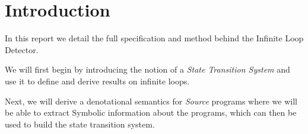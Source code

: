 

\newtheorem{example}{Example}[section]

\newtheorem{exercise}{Exercise}[section]

\newtheorem{excursion}{Excursion}[section]

\newtheorem{definition}{Definition}[section]

\newtheorem{theorem}{Theorem}[section]

\newtheorem{lemma}{Lemma}[section]

\newtheorem{corollary}{Corollary}[section]

\newtheorem{proposition}{Proposition}[section]

\newenvironment{proof}{%
\noindent
\textbf{Proof:}
}%
{
\hfill \qed\\
\medskip
}

\newcommand{\qed}{$\Box$}

\newcommand{\Rule}[2]{\genfrac{}{}{0.7pt}{}{{\setlength{\fboxrule}{0pt}\setlength{\fboxsep}{3mm}\fbox{$#1$}}}{{\setlength{\fboxrule}{0pt}\setlength{\fboxsep}{3mm}\fbox{$#2$}}}}

\newcommand{\Rulee}[3]{\genfrac{}{}{0.7pt}{}{{\setlength{\fboxrule}{0pt}\setlength{\fboxsep}{3mm}\fbox{$#1$}}}{{\setlength{\fboxrule}{0pt}\setlength{\fboxsep}{3mm}\fbox{$#2$}}}[#3]}

\newcommand{\under}{|}
\newcommand{\eval}{\to}
\newcommand{\transition}{\rightrightarrows_s}
\newcommand{\translate}{\twoheadrightarrow}
\newcommand{\translateaux}{\hookrightarrow}
\newcommand{\TruE}{\textbf{\texttt{true}}}
\newcommand{\FalsE}{\textbf{\texttt{false}}}



\section{Introduction}
In this report we detail the full specification and method behind the Infinite Loop Detector.

We will first begin by introducing the notion of a {\it State Transition System} and use it to define and derive results on infinite loops.

Next, we will derive a denotational semantics for {\it Source} programs where we will be able to extract Symbolic information about the programs, which can then be used to build the state transition system.

